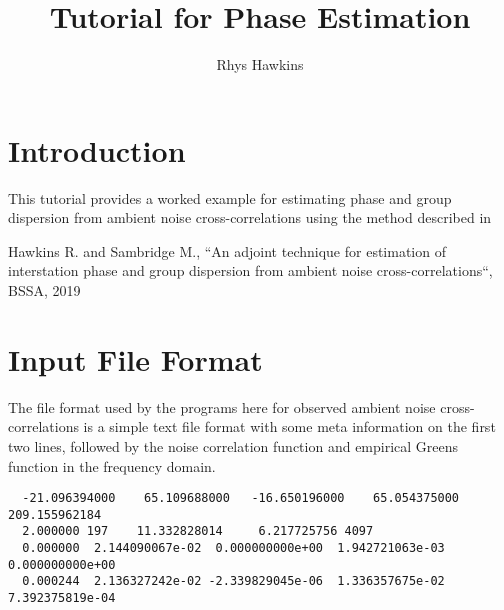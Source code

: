 \documentclass{article}
\begin{document}
\title{Tutorial for Phase Estimation}
\author{Rhys Hawkins}
\maketitle

\section{Introduction}

This tutorial provides a worked example for estimating phase and group dispersion
from ambient noise cross-correlations using the method described in

\begin{flushleft}
  Hawkins R. and Sambridge M., ``An adjoint technique for estimation of interstation phase and
  group dispersion from ambient noise cross-correlations``, BSSA, 2019
\end{flushleft}

\section{Input File Format}

The file format used by the programs here for observed ambient noise cross-correlations is
a simple text file format with some meta information on the first two lines, followed by
the noise correlation function and empirical Greens function in the frequency domain.

\begin{verbatim}
  -21.096394000    65.109688000   -16.650196000    65.054375000   209.155962184
  2.000000 197    11.332828014     6.217725756 4097
  0.000000  2.144090067e-02  0.000000000e+00  1.942721063e-03  0.000000000e+00
  0.000244  2.136327242e-02 -2.339829045e-06  1.336357675e-02  7.392375819e-04
\end{verbatim}
\end{document}
